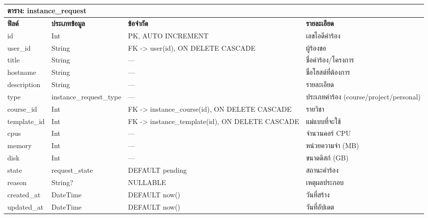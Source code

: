 \begin{table}[htbp]
    \caption{}\label{tab3:instance_request_fields}
    \centering
    \renewcommand{\arraystretch}{1.2}
    \small
    \begin{tabular}{p{} p{} p{} p{}}
        \hline
        \multicolumn{4}{l}{\textbf{ตาราง: instance\_request}} \\
        \hline
            \textbf{ฟิลด์} & \textbf{ประเภทข้อมูล} & \textbf{ข้อจำกัด} & \textbf{รายละเอียด} \\
        \hline
        id & Int & PK, AUTO INCREMENT & เลขไอดีคำร้อง \\
        user\_id & String & FK -> user(id), ON DELETE CASCADE & ผู้ร้องขอ \\
        title & String & — & ชื่อคำร้อง/โครงการ \\
        hostname & String & — & ชื่อโฮสต์ที่ต้องการ \\
        description & String & — & รายละเอียด \\
        type & instance\_request\_type & — & ประเภทคำร้อง (course/project/personal) \\
        course\_id & Int & FK -> instance\_course(id), ON DELETE CASCADE & รายวิชา \\
        template\_id & Int & FK -> instance\_template(id), ON DELETE CASCADE & แม่แบบที่จะใช้ \\
        cpus & Int & — & จำนวนคอร์ CPU \\
        memory & Int & — & หน่วยความจำ (MB) \\
        disk & Int & — & ขนาดดิสก์ (GB) \\
        state & request\_state & DEFAULT pending & สถานะคำร้อง \\
        reason & String? & NULLABLE & เหตุผลประกอบ \\
        created\_at & DateTime & DEFAULT now() & วันที่สร้าง \\
        updated\_at & DateTime & DEFAULT now() & วันที่อัปเดต \\
        \hline
    \end{tabular}
\end{table}

